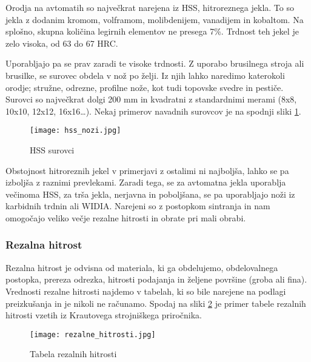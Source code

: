 Orodja na avtomatih so največkrat narejena iz HSS, 
hitroreznega jekla. To so jekla z dodanim kromom, volframom, 
molibdenijem, vanadijem in kobaltom. Na splošno, skupna količina 
legirnih elementov ne presega 7\%. Trdnost teh jekel je zelo visoka, 
od 63 do 67 HRC.

Uporabljajo pa se prav zaradi te visoke trdnosti. Z uporabo 
brusilnega stroja ali brusilke, se surovec obdela v nož po želji. 
Iz njih lahko naredimo katerokoli orodje; stružne, odrezne, 
profilne nože, kot tudi topovske svedre in pestiče. Surovci so 
največkrat dolgi 200 mm in kvadratni z standardnimi merami 
(8x8, 10x10, 12x12, 16x16…). Nekaj primerov navadnih surovcov
je na spodnji sliki \ref{hss_nozi}.

\begin{figure}[H]
    \begin{center}
        \texttt{[image: hss\_nozi.jpg]}
        \caption{HSS surovci
        \cite{hss_nozi}}
        \label{hss_nozi}
    \end{center}
\end{figure}

Obstojnost hitroreznih jekel v primerjavi z ostalimi ni najboljša, 
lahko se pa izboljša z raznimi prevlekami. Zaradi tega, se za 
avtomatna jekla uporablja večinoma HSS, za trša jekla, nerjavna 
in poboljšana, se pa uporabljajo noži iz karbidnih trdnin ali 
WIDIA. Narejeni so z postopkom sintranja in nam omogočajo veliko 
večje rezalne hitrosti in obrate pri mali obrabi.

\newpage
\subsubsection{Rezalna hitrost}
Rezalna hitrost je odvisna od materiala, ki ga obdelujemo, 
obdelovalnega postopka, prereza odrezka, hitrosti podajanja 
in željene površine (groba ali fina). Vrednosti rezalne hitrosti 
najdemo v tabelah, ki so bile narejene na podlagi preizkušanja 
in je nikoli ne računamo. Spodaj na sliki \ref{rezalna_hitrost}
je primer tabele rezalnih hitrosti vzetih iz Krautovega strojniškega
priročnika.

\begin{figure}[H]
    \begin{center}
        \texttt{[image: rezalne\_hitrosti.jpg]}
        \caption{Tabela rezalnih hitrosti
        \cite{strojniski_prirocnik}}
        \label{rezalna_hitrost}
    \end{center}
\end{figure}

